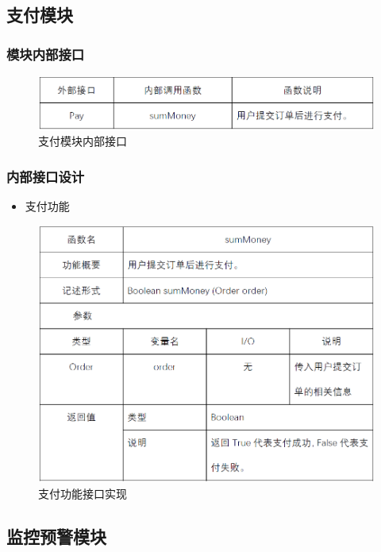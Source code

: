 \subsection{支付模块}
\subsubsection{模块内部接口}
\begin{figure}[!htbp]
	\centering
	\includegraphics[scale=0.7]{image/b13.png} %
	\caption{支付模块内部接口} %
\end{figure}
\subsubsection{内部接口设计}
\begin{itemize}
	\item 支付功能
\end{itemize}
\begin{figure}[!htbp]
	\centering
	\includegraphics[scale=0.7]{image/b14.png} %
	\caption{支付功能接口实现} %
\end{figure}
\subsection{监控预警模块}
